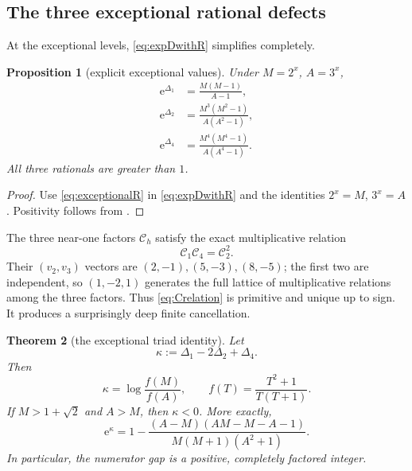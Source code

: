\documentclass[11pt]{article}
\numberwithin{equation}{section}
\newtheorem{theorem}{Theorem}[section]
\newtheorem{proposition}[theorem]{Proposition}
\theoremstyle{definition}
\theoremstyle{remark}
\newcommand{\e}{\mathrm e}
\begin{document}
\subsection{The three exceptional rational defects}

At the exceptional levels, \eqref{eq:expDwithR} simplifies completely.

\begin{proposition}[explicit exceptional values]\label{prop:exceptionalD}
Under $M=2^x$, $A=3^x$,
\begin{align}
  \e^{\Delta_1}
  &=\frac{M(M-1)}{A-1},\label{eq:D1rat}\\
  \e^{\Delta_2}
  &=\frac{M^3(M^2-1)}{A(A^2-1)},\label{eq:D2rat}\\
  \e^{\Delta_4}
  &=\frac{M^4(M^4-1)}{A(A^4-1)}.\label{eq:D4rat}
\end{align}
All three rationals are greater than $1$.
\end{proposition}

\begin{proof}
Use \eqref{eq:exceptionalR} in \eqref{eq:expDwithR} and the identities $2^x=M$, $3^x=A$.  Positivity follows from .
\end{proof}

The three near-one factors $\mathcal C_h$ satisfy the exact multiplicative relation
\begin{equation}\label{eq:Crelation}
  \mathcal C_1\mathcal C_4=\mathcal C_2^2.
\end{equation}
Their $(v_2,v_3)$ vectors are $(2,-1),(5,-3),(8,-5)$; the first two are independent, so $(1,-2,1)$ generates the full lattice of multiplicative relations among the three factors.  Thus \eqref{eq:Crelation} is primitive and unique up to sign.  It produces a surprisingly deep finite cancellation.

\begin{theorem}[the exceptional triad identity]\label{thm:triad}
Let
\begin{equation}\label{eq:kappa}
  \kappa:=\Delta_1-2\Delta_2+\Delta_4.
\end{equation}
Then
\begin{equation}\label{eq:kappaf}
  \kappa=\log\frac{f(M)}{f(A)},
  \qquad
  f(T)=\frac{T^2+1}{T(T+1)}.
\end{equation}
If $M>1+\sqrt2$ and $A>M$, then $\kappa<0$.  More exactly,
\begin{equation}\label{eq:kappaGap}
  \e^\kappa
  =1-\frac{(A-M)(AM-M-A-1)}{M(M+1)(A^2+1)}.
\end{equation}
In particular, the numerator gap is a positive, completely factored integer.
\end{theorem}
\end{document}
